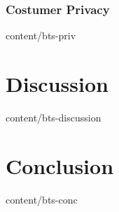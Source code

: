 \documentclass{btswhitepaper}
\begin{document}
\subsubsection { Costumer Privacy                  }  { content/bts-priv            } 

\section       { Discussion                        }  { content/bts-discussion      } 

\section       { Conclusion                        }  { content/bts-conc            } 



\end{document}
